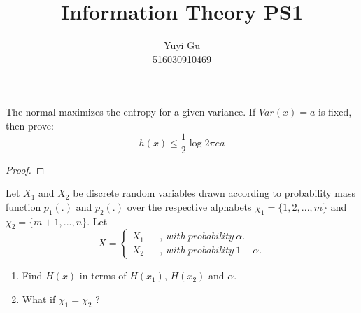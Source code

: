 \documentclass[12pt]{article}
\newenvironment{problem}[2][Problem]{\begin{trivlist}
\item[\hskip \labelsep {\bfseries #1}\hskip \labelsep {\bfseries #2.}]}{\end{trivlist}}
\begin{document}
 
 
\title{Information Theory PS1}%
\author{Yuyi Gu\\ %
516030910469} %
 
\maketitle
\begin{problem}{1 Maximum entropy}
    \item The normal maximizes the entropy for a given variance. If $Var(x)=a$ is fixed, then prove: $$h(x)\leq \frac{1}{2}\log2\pi ea$$
\end{problem}

\begin{proof}{}

\end{proof}

\begin{problem}{2 Entropy of a disjoint mixture}
    \item Let $X_{1}$ and $X_{2}$ be discrete random variables drawn according to probability mass function $p_{1}(.)$ and $p_{2}(.)$ over the respective alphabets $\chi_{1}=\{1,2,...,m\}$ and $\chi_{2}=\{m+1,...,n\}$. Let
    $$X=\left\{
    \begin{array}{rcl}
    X_1 & & {, \  with \ probability \  \alpha.} \\
    X_2 & & {, \ with \ probability \  1-\alpha.} 
    \end{array}
    \right.
    $$
    \begin{enumerate}[label=(\arabic*)]
    \item Find $H(x)$ in terms of $H\left(x_1\right)$, $H\left(x_2\right)$ and $\alpha$.
    \item What if $\chi_{1}= \chi_{2}$ ?
    \end{enumerate}
\end{problem}
\end{document}
